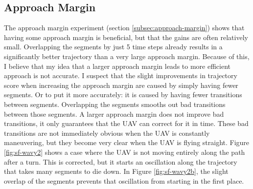 \subsection{Approach Margin}
The approach margin experiment (section \ref{subsec:approach-margin}) shows that having some approach margin is beneficial, but that the gains are often relatively small. Overlapping the segments by just 5 time steps already results in a significantly better trajectory than a very large approach margin. Because of this, I believe that my idea that a larger approach margin leads to more efficient approach is not accurate. I suspect that the slight improvements in trajectory score when increasing the approach margin are caused by simply having fewer segments. Or to put it more accurately: it is caused by having fewer transitions between segments. Overlapping the segments smooths out bad transitions between those segments. A larger approach margin does not improve bad transitions, it only guarantees that the UAV can correct for it in time. These bad transitions are not immediately obvious when the UAV is constantly maneuvering, but they become very clear when the UAV is flying straight. Figure \ref{fig:sf-wavy2} shows a case where the UAV is not moving entirely along the path after a turn. This is corrected, but it starts an oscillation along the trajectory that takes many segments to die down. In Figure \ref{fig:sf-wavy2b}, the slight overlap of the segments prevents that oscillation from starting in the first place. 
